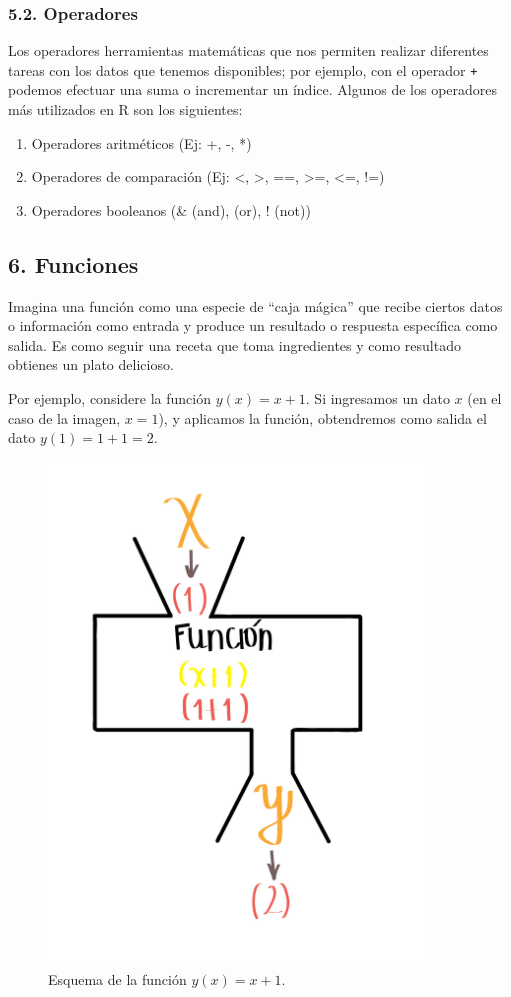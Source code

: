 \documentclass[
]{article}
\begin{document}
\subsubsection{5.2. Operadores}\label{operadores}

Los operadores herramientas matemáticas que nos permiten realizar
diferentes tareas con los datos que tenemos disponibles; por ejemplo,
con el operador \texttt{+} podemos efectuar una suma o incrementar un
índice. Algunos de los operadores más utilizados en R son los
siguientes:

\begin{enumerate}
\def\labelenumi{\arabic{enumi}.}
\item
  Operadores aritméticos (Ej: +, -, *)
\item
  Operadores de comparación (Ej: \textless, \textgreater, ==,
  \textgreater=, \textless=, !=)
\item
  Operadores booleanos (\& (and), \textbar{} (or), ! (not))
\end{enumerate}

\subsection{6. Funciones}\label{funciones}

Imagina una función como una especie de ``caja mágica'' que recibe
ciertos datos o información como entrada y produce un resultado o
respuesta específica como salida. Es como seguir una receta que toma
ingredientes y como resultado obtienes un plato delicioso.

Por ejemplo, considere la función \(y(x)=x+1\). Si ingresamos un dato
\(x\) (en el caso de la imagen, \(x=1\)), y aplicamos la función,
obtendremos como salida el dato \(y(1)=1+1=2\).

\begin{figure}
\centering
\includegraphics[width=10cm,height=\textheight,keepaspectratio]{img/ImagenFuncion.JPG}
\caption{Esquema de la función \(y(x)=x+1\).}
\end{figure}
\end{document}
